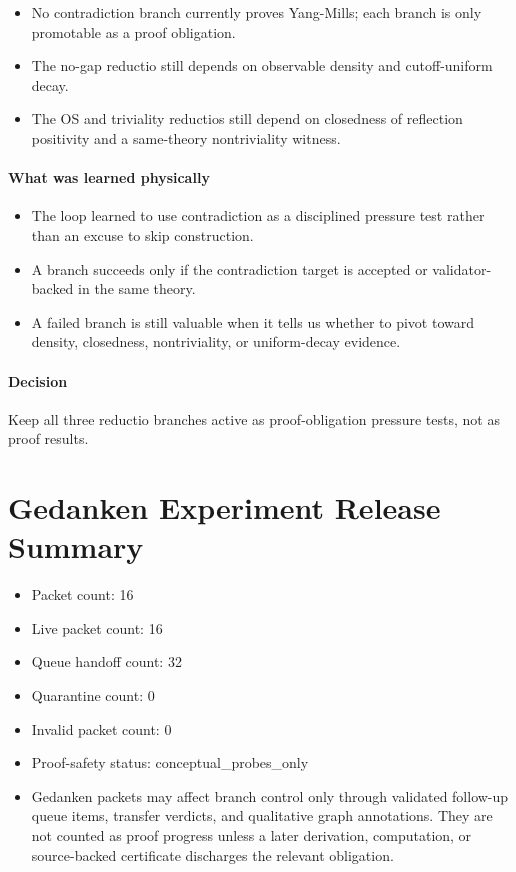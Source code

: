\documentclass[11pt]{article}
\begin{document}
\begin{itemize}
\item No contradiction branch currently proves Yang-Mills; each branch is only promotable as a proof obligation.
\item The no-gap reductio still depends on observable density and cutoff-uniform decay.
\item The OS and triviality reductios still depend on closedness of reflection positivity and a same-theory nontriviality witness.
\end{itemize}

\paragraph{What was learned physically}

\begin{itemize}
\item The loop learned to use contradiction as a disciplined pressure test rather than an excuse to skip construction.
\item A branch succeeds only if the contradiction target is accepted or validator-backed in the same theory.
\item A failed branch is still valuable when it tells us whether to pivot toward density, closedness, nontriviality, or uniform-decay evidence.
\end{itemize}

\paragraph{Decision}

Keep all three reductio branches active as proof-obligation pressure tests, not as proof results.

\section*{Gedanken Experiment Release Summary}

\begin{itemize}
\item Packet count: 16
\item Live packet count: 16
\item Queue handoff count: 32
\item Quarantine count: 0
\item Invalid packet count: 0
\item Proof-safety status: conceptual\_probes\_only
\item Gedanken packets may affect branch control only through validated follow-up queue items, transfer verdicts, and qualitative graph annotations. They are not counted as proof progress unless a later derivation, computation, or source-backed certificate discharges the relevant obligation.
\end{itemize}
\end{document}
